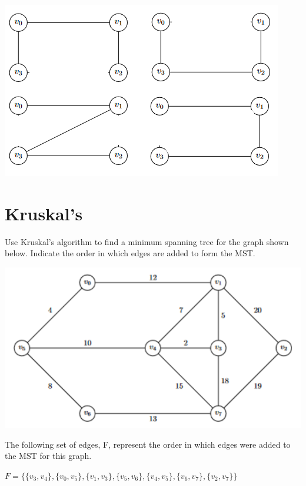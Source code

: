 \documentclass[11pt]{article}
\begin{document}
\begin{center}
\includegraphics{Q1A2.png}
\end{center}

\bigskip
\bigskip

\section{Kruskal's} %
Use Kruskal's algorithm to find a minimum spanning tree for the graph shown below. Indicate the order in which edges are added to form the MST.

\begin{center}
\includegraphics{Q2.png}
\end{center}

\bigskip
\bigskip

\noindent The following set of edges, F, represent the order in which edges were added to the MST for this graph.

\begin{center}
$F = \{\{v_3, v_4\}, \{v_0, v_5\}, \{v_1, v_3\}, \{v_5, v_6\}, \{v_4, v_5\}, \{v_6, v_7\}, \{v_2, v_7\}\}$
\end{center}
\end{document}
